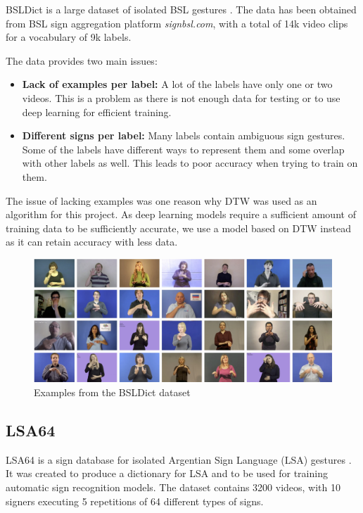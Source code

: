\documentclass[final,dissertation.tex]{subfiles}
\begin{document}
BSLDict is a large dataset of isolated BSL gestures \cite{momeni2020watch}. The data has been obtained from BSL sign aggregation platform \textit{signbsl.com}, with a total of 14k video clips for a vocabulary of 9k labels.

The data provides two main issues:

\begin{itemize}
    \item \textbf{Lack of examples per label: }A lot of the labels have only one or two videos. This is a problem as there is not enough data for testing or to use deep learning for efficient training.
    \item \textbf{Different signs per label: }Many labels contain ambiguous sign gestures. Some of the labels have different ways to represent them and some overlap with other labels as well. This leads to poor accuracy when trying to train on them.
\end{itemize}

The issue of lacking examples was one reason why DTW was used as an algorithm for this project. As deep learning models require a sufficient amount of training data to be sufficiently accurate, we use a model based on DTW instead as it can retain accuracy with less data.

\begin{figure}
    \begin{center}
        \includegraphics[scale=0.07]{images/BSLDict.jpeg}
        \caption[caption]{Examples from the BSLDict dataset}
    \end{center}
\end{figure}

\subsection*{LSA64}

LSA64 is a sign database for isolated Argentian Sign Language (LSA) gestures \cite{ronchetti2016lsa64}. It was created to produce a dictionary for LSA and to be used for training automatic sign recognition models. The dataset contains 3200 videos, with 10 signers executing 5 repetitions of 64 different types of signs.
\end{document}
